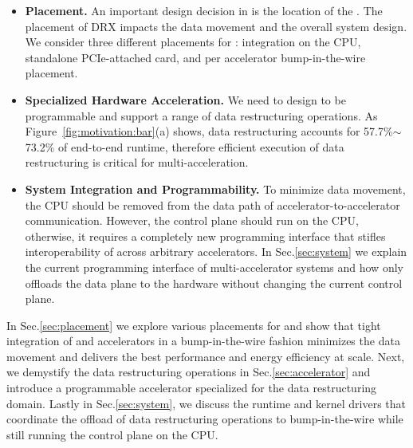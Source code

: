 \begin{itemize}
\item \textbf{\drx Placement. }
%
An important design decision in \dmx is the location of the \drx. 
%
The placement of DRX impacts the data movement and the overall system design.
%
We consider three different placements for \drx: integration on the CPU, standalone PCIe-attached card, and per accelerator bump-in-the-wire placement. 
%

\item \textbf{Specialized Hardware Acceleration.}
%
We need to design \drx to be programmable and support a range of data restructuring operations. 
As Figure~\ref{fig:motivation:bar}(a) shows, data restructuring accounts for 57.7\%$\sim$73.2\% of end-to-end runtime, therefore efficient execution of data restructuring is critical for multi-acceleration.  

\item \textbf{System Integration and Programmability.}
%
%
To minimize data movement, the CPU should be removed from the data path of accelerator-to-accelerator communication. 
%
However, the control plane should run on the CPU, otherwise, it requires a completely new programming interface that stifles interoperability of \dmx across arbitrary accelerators.
%
In Sec.\ref{sec:system} we explain the current programming interface of multi-accelerator systems and how \dmx only offloads the data plane to the hardware without changing the current control plane.  

\end{itemize}


In Sec.\ref{sec:placement} we explore various placements for \drx and show that tight integration of \drx and accelerators in a bump-in-the-wire fashion minimizes the data movement and delivers the best performance and energy efficiency at scale. 
%
%
Next, we demystify the data restructuring operations in Sec.\ref{sec:accelerator} and introduce a programmable accelerator specialized for the data restructuring domain. 
%
Lastly in Sec.\ref{sec:system}, we discuss the runtime and kernel drivers that coordinate the offload of data restructuring operations to bump-in-the-wire \drx while still running the control plane on the CPU. 

